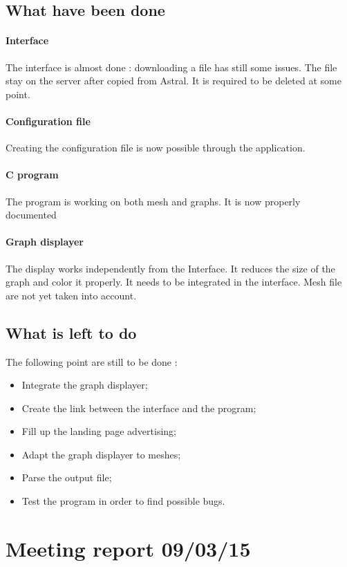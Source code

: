 \documentclass{cranfieldChart}
\begin{document}
\subsection*{What have been done}
\paragraph{Interface}
The interface is almost done : downloading a file has still some issues. The file stay on the server after copied from Astral. It is required to be deleted at some point.
\paragraph{Configuration file}
Creating the configuration file is now possible through the application.
\paragraph{C program}
The program is working on both mesh and graphs. It is now properly documented
\paragraph{Graph displayer}
The display works independently from the Interface. It reduces the size of the graph and color it properly. It needs to be integrated in the interface. Mesh file are not yet taken into account.

\subsection*{What is left to do}
The following point are still to be done :
\begin{itemize}
	\item Integrate the graph displayer;
	\item Create the link between the interface and the program;
	\item Fill up the landing page advertising;
	\item Adapt the graph displayer to meshes;
	\item Parse the output file;
	\item Test the program in order to find possible bugs.
\end{itemize}
 

\newpage
\section{Meeting report 09/03/15}
\end{document}
